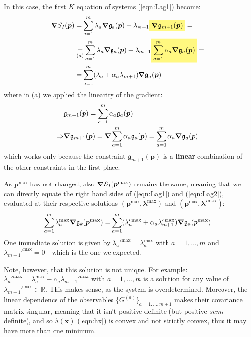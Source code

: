 \documentclass[../../main.tex]{subfiles}
\begin{document}
\begin{exo}
    \medskip

    In this case, the first $K$ equation of systems (\ref{eqn:Lag1}) become:
    \begin{align} \nonumber
        \grad S_I(\bm{p}) &= \sum_{a=1}^m \lambda_a \grad \mathfrak g_a(\bm{p}) + \lambda_{m+1}  \hlc{Yellow}{\grad \mathfrak{g}_{m+1}(\bm{p})} =\\ \nonumber
        &\underset{(a)}{=}  \sum_{a=1}^m \lambda_a \grad \mathfrak g_a(\bm{p}) + \lambda_{m+1} \hlc{Yellow}{\sum_{a=1}^m \alpha_a \grad \mathfrak{g}_a(\bm{p})} =\\
        &= \sum_{a=1}^m (\lambda_a + \alpha_a \lambda_{m+1}) \grad \mathfrak g_a(\bm{p}) \label{eqn:Lag2}
    \end{align}
    where in (a) we applied the linearity of the gradient:
    \begin{align*}
        &\mathfrak{g}_{m+1}(\bm{p}) = \sum_{a=1}^m \alpha_a \mathfrak{g}_a (\bm{p}) \\
        \Rightarrow 
        &\grad \mathfrak{g}_{m+1} (\bm{p}) = \grad \sum_{a=1}^m \alpha_a \mathfrak{g}_a (\bm{p}) = \sum_{a=1}^m \alpha_a \grad \mathfrak{g}_a(\bm{p}) 
    \end{align*}
    which works only because the constraint $\mathfrak{g}_{m+1}(\bm{p})$ is a \textbf{linear} combination of the other constraints in the first place.

    As $\bm{p}^{\max}$ has not changed, also $\grad S_I(\bm{p}^{\max})$ remains the same, meaning that we can directly equate the right hand sides of (\ref{eqn:Lag1}) and (\ref{eqn:Lag2}), evaluated at their respective solutions $(\bm{p}^{\max}, \bm{\lambda}^{\max})$ and $(\bm{p}^{\max}, \bm{\lambda'}^{\max})$:
    \begin{align*}
        \sum_{a=1}^m \lambda_a^{\max} \grad \mathfrak{g}_k (\bm{p}^{\max}) = \sum_{a=1}^m (\lambda_a'^{\max} + \alpha_a \lambda_{m+1}'^{\max}) \grad \mathfrak g_a(\bm{p}^{\max})
    \end{align*}
    One immediate solution is given by $\lambda_a'^{\max} = \lambda_a^{\max}$ with $a=1,\dots,m$ and $\lambda_{m+1}'^{\max} = 0$ - which is the one we expected.

    \medskip

    Note, however, that this solution is not unique. For example: $\lambda_a'^{\max} = \lambda_a^{\max} - \alpha_a \lambda_{m+1}'^{\max}$ with $a=1,\dots,m$ is a solution for any value of $\lambda_{m+1}'^{\max} \in \mathbb{R}$. This makes sense, as the system is overdetermined. Moreover, the linear dependence of the observables $\{G^{(a)}\}_{a=1,\dots,m+1}$ makes their covariance matrix singular, meaning that it isn't positive definite (but positive \textit{semi}-definite), and so $h(\bm{x})$ (\ref{eqn:hx}) is convex and not strictly convex, thus it may have more than one minimum.

\end{exo}
\end{document}
